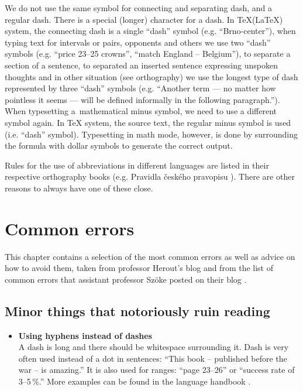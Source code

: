 {{We do not use the same symbol for connecting and separating dash, and a regular dash. There is a special (longer) character for a dash. In \TeX (\LaTeX ) system, the connecting dash is a single ``dash'' symbol (e.g. ``Brno-center''), when typing text for intervals or pairs, opponents and others we use two ``dash'' symbols (e.g. ``price 23--25 crowns'', ``match England -- Belgium''), to separate a section of a sentence, to separated an inserted sentence expressing unspoken thoughts and in other situation (see orthography) we use the longest type of dash represented by three ``dash'' symbols (e.g. ``Another term --- no matter how pointless it seems --- will be defined informally in the following paragraph.''). When typesetting a~mathematical minus symbol, we need to use a different symbol again. In TeX system, the source text, the regular minus symbol is used (i.e. ``dash'' symbol). Typesetting in math mode, however, is done by surrounding the formula with dollar symbols to generate the correct output.

Rules for the use of abbreviations in different languages are listed in their respective orthography books (e.g. Pravidla českého pravopisu \cite{Pravidla}). There are other reasons to always have one of these close.

\section{Common errors}
\label{chyby}

This chapter contains a selection of the most common errors as well as advice on how to avoid them, taken from professor Herout's blog \cite{Herout} and from the list of common errors that assistant professor Szöke posted on their blog \cite{chyby}.

\subsection*{Minor things that notoriously ruin reading}

\begin{itemize}
	\item{
		\textbf{Using hyphens instead of dashes} \\
		A dash is long and there should be whitespace surrounding it. Dash is very often used instead of a dot in sentences: ``This book -- published before the war -- is amazing.'' It is also used for ranges: 	``page 23--26'' or ``success rate of 3--5\,\%.'' More examples can be found in the language handbook \cite{prirucka}.

}
\end{itemize}}}
